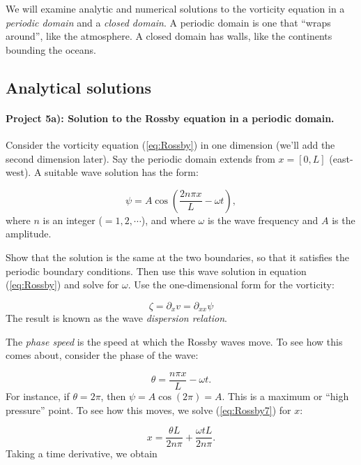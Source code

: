 \documentclass[%
oneside,                 %
final,                   %
10pt]{article}
\begin{document}
We will examine analytic and numerical solutions to the vorticity
equation in a \emph{periodic domain} and a \emph{closed domain}. A
periodic domain is one that ``wraps around'', like the atmosphere. A
closed domain has walls, like the continents bounding the oceans.

\subsection{Analytical solutions}

\paragraph{Project 5a): Solution to the Rossby equation in a periodic domain.}
Consider the vorticity equation (\ref{eq:Rossby}) in one dimension
(we'll add the second dimension later). Say the periodic domain
extends from $x=[0,L]$ (east-west). A suitable wave solution has the
form:

\begin{equation}
  \label{eq:Rossby5}
	\psi = A \cos{(\frac{2n\pi x}{L} - \omega t)}, 
\end{equation}
where $n$ is an integer ($=1,2,\cdots$), and where $\omega$ is the
wave frequency and $A$ is the amplitude.

Show that the solution is the same at the two boundaries, so that it
satisfies the periodic boundary conditions. Then use this wave solution
in equation (\ref{eq:Rossby}) and solve for $\omega$. Use the
one-dimensional form for the vorticity:

\begin{equation}
  \label{eq:Rossby6}
	\zeta = \partial_x v = \partial_{xx} \psi
\end{equation}
The result is known as the wave \emph{dispersion relation}.

The \emph{phase speed} is the speed at which the Rossby waves move. To see how this comes about, consider the phase of the wave:

\begin{equation}
  \label{eq:Rossby7}
	\theta = \frac{n\pi x}{L} - \omega t.
\end{equation}
For instance, if $\theta=2\pi$, then $\psi = A\cos{(2\pi)} = A$. This is a maximum or ``high pressure'' point. To see how this moves, we solve (\ref{eq:Rossby7}) for $x$:

\begin{equation}
	x = \frac{\theta L}{2n\pi} + \frac{\omega tL}{2n\pi}.
\end{equation}
Taking a time derivative, we obtain
\end{document}
